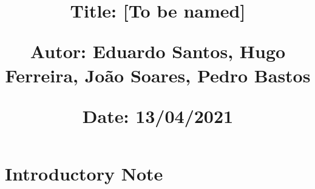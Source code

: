 \documentclass{article}
\begin{document}
\title{\vspace{-0.9cm}
       \vspace{1cm}
       \normalsize
       \raggedright\textbf{Title: \hspace{1.5cm} [To be named]} \\ \vspace{0.4cm}
       \raggedright\textbf{Autor: \hspace{1.3cm} Eduardo Santos, Hugo Ferreira, João Soares, Pedro Bastos} \\ \vspace{0.4cm}
       \raggedright\textbf{Date: \hspace{1.45cm} 13/04/2021} \\}
\author{}
\date{}

\maketitle
\thispagestyle{fancy}


\vspace{-1.4cm}

\tableofcontents


\fontsize{10pt}{13pt}
\selectfont
\lsstyle


\newpage

\section{Introductory Note}



\nocite{*}
\printbibliography
\end{document}

